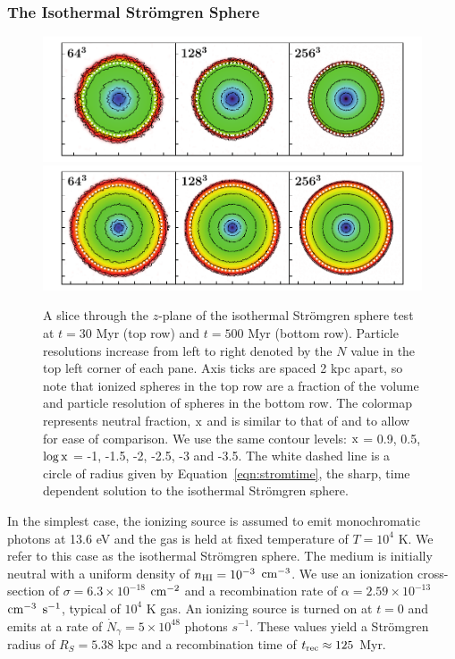 \documentclass[fleq,usenatbib]{mnras}
\newcommand{\strom}{Str\"omgren}
\begin{document}
{\subsubsection{The Isothermal \strom{} Sphere}
\begin{figure}
\includegraphics[width=1\linewidth]{Figures/strom_slice_iso_030.pdf}
\includegraphics[width=1\linewidth]{Figures/strom_slice_iso_500.pdf}
\caption{A slice through the $z$-plane of the isothermal \strom{} sphere
test at $t=30$ Myr (top row) and $t=500$ Myr (bottom row). Particle 
resolutions increase from left to right denoted by the $N$ value in the top 
left corner of each pane. Axis ticks are spaced 2 kpc apart, so note that 
ionized spheres in the top row are a fraction of the volume and particle 
resolution of spheres in the bottom row. The colormap represents neutral 
fraction, $\rm x$ and is similar to that of \protect\cite{pawlikSchaye08} and 
\protect\cite{pawlikSchaye11} to allow for ease of comparison.  We use the same
contour levels: $\rm x$ = 0.9, 0.5, $\log \rm x$ = -1, -1.5, 
-2, -2.5, -3 and -3.5. The white dashed line is a circle of radius given by 
Equation~\ref{eqn:stromtime}, the sharp, time dependent solution to the 
isothermal \strom{} sphere.}
\label{fig:stromslice}
\end{figure}
In the simplest case, the ionizing source is assumed to emit monochromatic 
photons at 13.6 eV and the gas is held at fixed temperature of $T=10^4$ K.
We refer to this case as the isothermal \strom{} sphere.  The medium is initially 
neutral with a uniform density of $n_{\rm HI} = 
10^{-3}$ $\rm cm^{-3}$. We use an 
ionization cross-section of $\sigma = 6.3 \times 10^{-18}$ $\rm cm^{-2}$ and a 
recombination rate of $\alpha = 2.59 \times 10^{-13}$ $\rm cm^{-3}$ $\rm 
s^{-1}$, typical of $10^4$ K gas.
An ionizing source is turned on at $t=0$ and emits at 
a rate of $\dot{N}_\gamma = 5 \times 10^{48}$ photons $s^{-1}$.  These values yield a \strom{} radius of 
$R_S = 5.38$ kpc and a recombination time of $t_{\rm rec} \approx  125$ Myr. 

}
\end{document}
